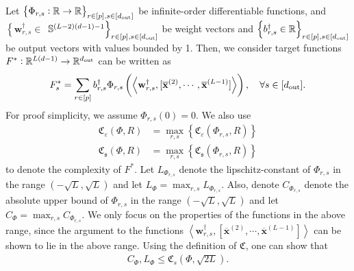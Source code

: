 \begin{definition}
	Let $\left\{\Phi_{r, s}: \mathbb{R} \rightarrow \mathbb{R}\right\}_{r \in [p], s \in [d_{\mathrm{out}} ]}$ be infinite-order differentiable functions, and $\left\{\mathbf{w}_{r, s}^{\dagger} \in\right.$
	$\left. \mathbb{S}^{(L-2)(d-1)-1}\right\}_{r \in[p], s \in[d_{\mathrm{out}} ]}$ be weight vectors and $\left\{b_{r, s}^{\dagger} \in \mathbb{R}\right\}_{r \in[p], s \in[d_{\mathrm{out}} ]}$ be output vectors with values bounded by 1. Then, we consider target functions $F^{\ast}: \mathbb{R}^{L(d-1)} \rightarrow \mathbb{R}^{d_{\mathrm{out}} }$ can be written as
	$$
	F_s^{\ast} = \sum_{r \in [p]} b_{r, s}^{\dagger} \Phi_{r, s} \left(\left\langle  \mathbf{w}_{r, s}^{\dagger}, [\overline{\mathbf{x}}^{(2)}, \cdots, \overline{\mathbf{x}}^{(L-1)}]\right\rangle\right) , \quad \forall s \in [d_{\mathrm{out}} ].
	$$
	For proof simplicity, we assume $\Phi_{r, s}(0)=0 .$ We also use
	\begin{align*}
		\mathfrak{C}_{\varepsilon}(\Phi, R)&=\max_{r, s}\left\{\mathfrak{C}_{\varepsilon}\left(\Phi_{r, s}, R\right)\right\} \\  \mathfrak{C}_{\mathfrak{s}}(\Phi, R)&=\max _{r, s}\left\{\mathfrak{C}_{\mathfrak{s}}\left(\Phi_{ r, s}, R\right)\right\}
	\end{align*}
	to denote the complexity of $F^{*}$. Let $L_{\Phi_{r, s}}$ denote the lipschitz-constant of $\Phi_{r, s}$ in the range $(-\sqrt{L}, \sqrt{L})$ and let $L_{\Phi} = \max_{r, s} L_{\Phi_{r, s}}$. Also, denote $C_{\Phi_{r, s}}$ denote the absolute upper bound of $\Phi_{r, s}$ in the range $(-\sqrt{L}, \sqrt{L})$ and let $C_{\Phi} = \max_{r, s} C_{\Phi_{r, s}}$. We only focus on the properties of the functions in the above range, since the argument to the functions $\left\langle  \mathbf{w}_{r, s}^{\dagger}, [\overline{\mathbf{x}}^{(2)}, \cdots, \overline{\mathbf{x}}^{(L-1)}]\right\rangle$ can be shown to lie in the above range. Using the definition of $\mathfrak{C}$, one can show that
	\begin{align*}
		C_{\Phi}, L_{\Phi} \le \mathfrak{C}_s(\Phi, \sqrt{2L}).
	\end{align*}
\end{definition}

